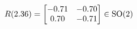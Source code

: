 \documentclass[preview]{standalone}
\begin{document}
\begin{align*}
\special{dvisvgm:raw <g id='unique000'>}R(2.36) = \begin{bmatrix} -0.71 & -0.70 \\ 0.70 & -0.71 \end{bmatrix} \in \text{SO}(2)\special{dvisvgm:raw </g>}
\end{align*}
\end{document}
